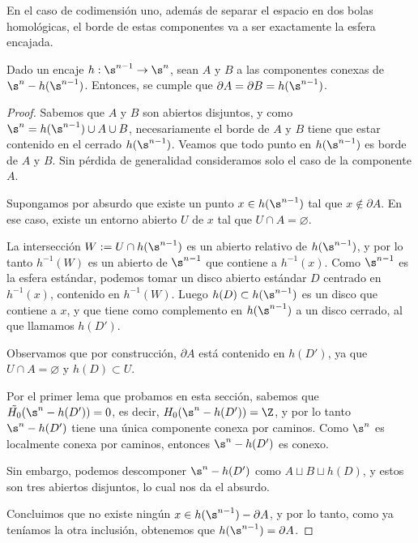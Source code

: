     En el caso de codimensión uno, además de separar el espacio en dos bolas homológicas, el borde de estas componentes va a ser exactamente la esfera encajada.

    \begin{lema}
    Dado un encaje $h:\s^{n-1}\to\s^n$, sean $A$ y $B$ a las componentes conexas de $\s^{n}-h(\s^{n-1})$. Entonces, se cumple que $\partial A = \partial B = h(\s^{n-1})$.
    \end{lema}

    \begin{proof}
    Sabemos que $A$ y $B$ son abiertos disjuntos, y como $\s^n = h(\s^{n-1}) \cup A \cup B$, necesariamente el borde de $A$ y $B$ tiene que estar contenido en el cerrado $h(\s^{n-1})$. Veamos que todo punto en $h(\s^{n-1})$ es borde de $A$ y $B$. Sin pérdida de generalidad consideramos solo el caso de la componente $A$.

    Supongamos por absurdo que existe un punto $x\in h(\s^{n-1})$ tal que $x\not\in\partial A$. En ese caso, existe un entorno abierto $U$ de $x$ tal que $U\cap A=\varnothing$. 

    La intersección $W := U\cap h(\s^{n-1})$ es un abierto relativo de $h(\s^{n-1})$, y por lo tanto $h^{-1}(W)$ es un abierto de $\s^{n-1}$ que contiene a $h^{-1}(x)$. Como $\s^{n-1}$ es la esfera estándar, podemos tomar un disco abierto estándar $D$ centrado en $h^{-1}(x)$, contenido en $h^{-1}(W)$. Luego $h(D)\subset h(\s^{n-1})$ es un disco que contiene a $x$, y que tiene como complemento en $h(\s^{n-1})$ a un disco cerrado, al que llamamos $h(D')$.

    Observamos que por construcción, $\partial A$ está contenido en $h(D')$, ya que $U\cap A=\varnothing$ y $h(D)\subset U$.

    Por el primer lema que probamos en esta sección, sabemos que $\tilde{H_0}(\s^n - h(D'))=0$, es decir, $H_0(\s^n - h(D'))=\Z$, y por lo tanto $\s^n - h(D')$ tiene una única componente conexa por caminos. Como $\s^n$ es localmente conexa por caminos, entonces $\s^n - h(D')$ es conexo.

    Sin embargo, podemos descomponer $\s^n - h(D')$ como $A\sqcup B\sqcup h(D)$, y estos son tres abiertos disjuntos, lo cual nos da el absurdo.
    
    Concluimos que no existe ningún $x\in h(\s^{n-1})-\partial A$, y por lo tanto, como ya teníamos la otra inclusión, obtenemos que $h(\s^{n-1})=\partial A$.
    
    \end{proof}
 


    
